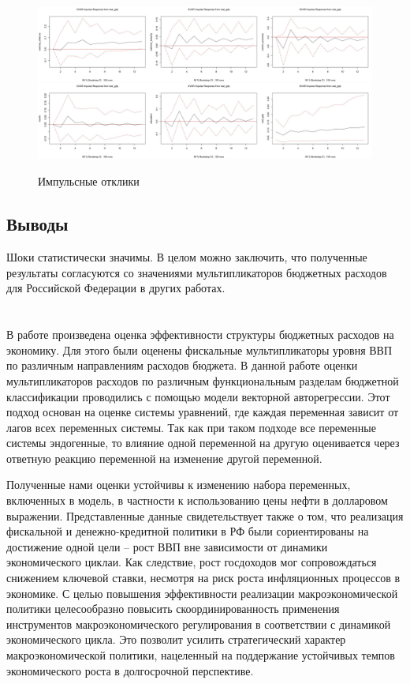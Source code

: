 \documentclass[12pt, a4paper]{extarticle}
\newcommand*{\sectionformat}{\centering}
\begin{document}
\begin{figure}[H]
  \caption{Импульсные отклики}
  \centering
  \noindent\includegraphics[width=\linewidth]{response.jpg}
  \label{fig:response}
\end{figure}


\subsection*{{Выводы}}

Шоки статистически значимы. В целом можно заключить, что полученные результаты согласуются со значениями мультипликаторов бюджетных расходов для Российской Федерации в других работах.

\newpage
\section*{\sectionformat {Заключение}}

\par
В работе произведена оценка эффективности структуры бюджетных расходов на экономику. Для этого были оценены фискальные мультипликаторы уровня ВВП по различным  направлениям расходов бюджета. В данной работе оценки мультипликаторов расходов по различным функциональным разделам бюджетной классификации проводились с помощью модели векторной авторегрессии. Этот подход основан на оценке системы уравнений, где каждая переменная зависит от лагов всех переменных системы. Так как при таком подходе все переменные системы эндогенные, то влияние одной переменной на другую оценивается через ответную реакцию переменной на изменение другой переменной.
\par
Полученные нами оценки устойчивы к изменению набора переменных, включенных в модель, в частности к использованию цены нефти в долларовом выражении. 
Представленные данные свидетельствует также о том, что реализация фискальной и денежно-кредитной политики в РФ были сориентированы на достижение одной цели -- рост ВВП вне зависимости от динамики экономического циклаи. Как следствие, рост госдоходов мог сопровождаться снижением ключевой ставки, несмотря на риск роста инфляционных процессов в экономике. С целью повышения эффективности реализации макроэкономической политики целесообразно повысить скоординированность применения инструментов макроэкономического регулирования в соответствии с динамикой экономического цикла. Это позволит усилить стратегический характер макроэкономической политики, нацеленный на поддержание устойчивых темпов экономического роста в долгосрочной перспективе.
\end{document}
